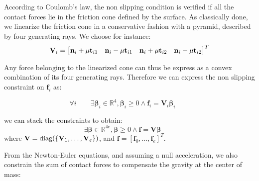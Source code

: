 According to Coulomb's law, the non slipping condition is verified if all the contact forces lie in the friction cone defined by the surface.
As classically done, we linearize the friction cone in a conservative fashion with a pyramid, described by four generating rays. We choose for instance:
\begin{equation*}
\mathbf{V}_{i} = \begin{bmatrix}\mathbf{n}_{i} + \mu \mathbf{t}_{i1} & \mathbf{n}_{i} -\mu \mathbf{t}_{i1} & \mathbf{n}_{i} + \mu \mathbf{t}_{i2} & \mathbf{n}_{i} - \mu \mathbf{t}_{i2}\end{bmatrix}^T
\end{equation*}

Any force belonging to the linearized cone
can thus be express as a convex combination of its four generating rays.
Therefore we can express the non slipping constraint on $\mathbf{f}_i$ as:

\begin{equation*}
\forall i  \qquad  \exists \bm{\beta}_i \in \mathbb{R}^{4} , \bm{\beta}_i \ge 0 \wedge \mathbf{f}_{i} = \mathbf{V}_{i} \bm{\beta}_i \qquad 
\end{equation*}

we can stack the constraints to obtain:
\begin{equation}\label{eq:gen}
\exists \bm{\beta} \in \mathbb{R}^{4e} ,  \bm{\beta} \ge 0 \wedge \mathbf{f} = \mathbf{V} \bm{\beta} \qquad 
\end{equation}
where $\mathbf{V} = \text{diag}( \{\mathbf{V}_1, \dots, \mathbf{V}_e\} )$, and $\mathbf{f} = [\mathbf{f}_0,...,\mathbf{f}_e]^T$.

From the Newton-Euler equations, and assuming a null acceleration, we also constrain the sum of contact forces to compensate the gravity at the center of mass:



